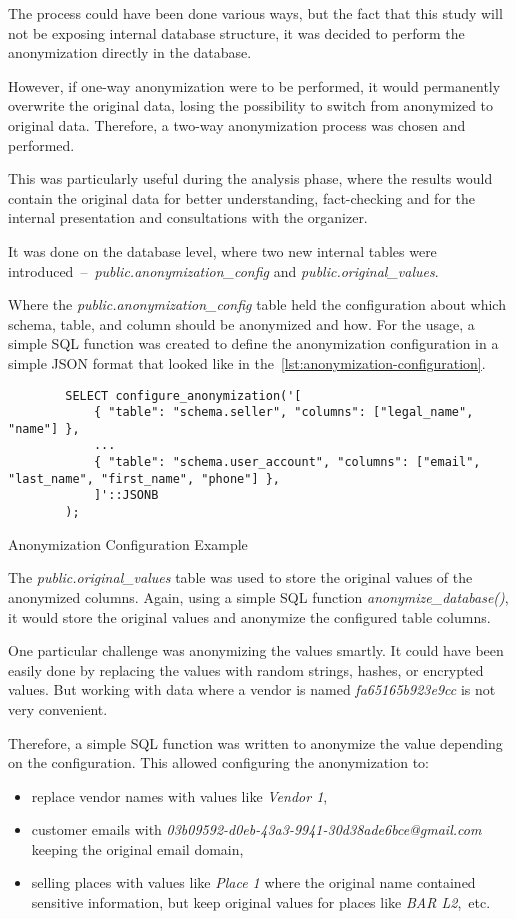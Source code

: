 The process could have been done various ways, but the fact that this study will not be exposing internal database structure, it was decided to perform the anonymization directly in the database.

However, if one-way anonymization were to be performed, it would permanently overwrite the original data, losing the possibility to switch from anonymized to original data.
Therefore, a two-way anonymization process was chosen and performed.

This was particularly useful during the analysis phase, where the results would contain the original data for better understanding, fact-checking and for the internal presentation and consultations with the organizer.

It was done on the database level, where two new internal tables were introduced~–~\textit{public.anonymization\_config} and \textit{public.original\_values}.

Where the \textit{public.anonymization\_config} table held the configuration about which schema, table, and column should be anonymized and how.
For the usage, a simple SQL function was created to define the anonymization configuration in a simple JSON format that looked like in the~\autoref{lst:anonymization-configuration}.

\begin{listing}[h]
	\begin{verbatim}
		SELECT configure_anonymization('[
			{ "table": "schema.seller", "columns": ["legal_name", "name"] },
			...
			{ "table": "schema.user_account", "columns": ["email", "last_name", "first_name", "phone"] },
			]'::JSONB
		);
	\end{verbatim}
	\caption{Anonymization Configuration Example}
	\label{lst:anonymization-configuration}
\end{listing}

The \textit{public.original\_values} table was used to store the original values of the anonymized columns.
Again, using a simple SQL function \textit{anonymize\_database()}, it would store the original values and anonymize the configured table columns.

One particular challenge was anonymizing the values smartly.
It could have been easily done by replacing the values with random strings, hashes, or encrypted values.
But working with data where a vendor is named \textit{fa65165b923e9cc} is not very convenient.

Therefore, a simple SQL function was written to anonymize the value depending on the configuration.
This allowed configuring the anonymization to:
\begin{itemize}
	\item replace vendor names with values like \textit{Vendor 1},
	\item customer emails with \textit{03b09592-d0eb-43a3-9941-30d38ade6bce@gmail.com} keeping the original email domain,
	\item selling places with values like \textit{Place 1} where the original name contained sensitive information, but keep original values for places like \textit{BAR L2},~etc.
\end{itemize}

